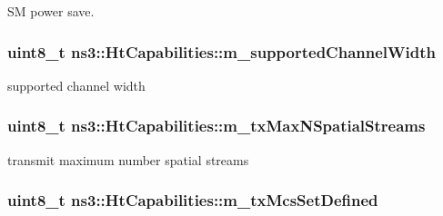 SM power save. 

\subsubsection[{\texorpdfstring{m\+\_\+supported\+Channel\+Width}{m_supportedChannelWidth}}]{\setlength{\rightskip}{0pt plus 5cm}uint8\+\_\+t ns3\+::\+Ht\+Capabilities\+::m\+\_\+supported\+Channel\+Width\hspace{0.3cm}{\ttfamily [private]}}\hypertarget{classns3_1_1HtCapabilities_ad16923ce5393308e4aed4df710608925}{}\label{classns3_1_1HtCapabilities_ad16923ce5393308e4aed4df710608925}


supported channel width 

\subsubsection[{\texorpdfstring{m\+\_\+tx\+Max\+N\+Spatial\+Streams}{m_txMaxNSpatialStreams}}]{\setlength{\rightskip}{0pt plus 5cm}uint8\+\_\+t ns3\+::\+Ht\+Capabilities\+::m\+\_\+tx\+Max\+N\+Spatial\+Streams\hspace{0.3cm}{\ttfamily [private]}}\hypertarget{classns3_1_1HtCapabilities_a936670bd18443100ffc6a83443101566}{}\label{classns3_1_1HtCapabilities_a936670bd18443100ffc6a83443101566}


transmit maximum number spatial streams 

\subsubsection[{\texorpdfstring{m\+\_\+tx\+Mcs\+Set\+Defined}{m_txMcsSetDefined}}]{\setlength{\rightskip}{0pt plus 5cm}uint8\+\_\+t ns3\+::\+Ht\+Capabilities\+::m\+\_\+tx\+Mcs\+Set\+Defined\hspace{0.3cm}{\ttfamily [private]}}\hypertarget{classns3_1_1HtCapabilities_a2be311804f4ccfcd0892218aa9739311}{}\label{classns3_1_1HtCapabilities_a2be311804f4ccfcd0892218aa9739311}


